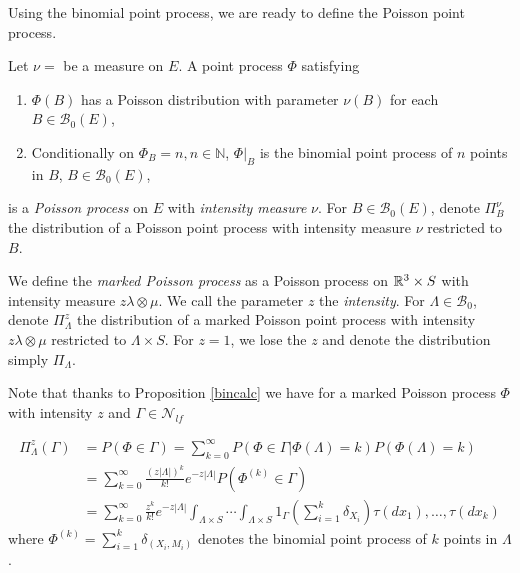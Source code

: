 Using the binomial point process, we are ready to define the Poisson point process. 

\begin{definition} Let $\nu=$ be a measure on $E$. A point process $\Phi$ satisfying
\begin{enumerate}
	\item $\Phi(B)$ has a Poisson distribution with parameter $\nu(B)$ for each $B\in \mathcal B_0(E)$,
	\item Conditionally on $\Phi_B=n, n\in\mathbb N$,  $\Phi|_B$ is the binomial point process of $n$ points in $B$, $B \in \mathcal B_0(E)$,
\end{enumerate}
is a \textit{Poisson process} on $E$ with \textit{intensity measure} $\nu$.
For $B\in \mathcal B_0(E)$, denote $\Pi^\nu_B$ the distribution of a Poisson point process with intensity measure $\nu$ restricted to $B$.  
\end{definition}

\begin{definition}We define the \textit{marked Poisson process} as a Poisson process on ${\mathbb R^3}\times S$ with intensity measure $z\lambda \otimes \mu$. We call the parameter $z$ the \textit{intensity}.\newline
	For $\Lambda\in \mathcal B_0$, denote $\Pi^z_\Lambda$ the distribution of a marked Poisson point process with intensity $z\lambda \otimes \mu$ restricted to $\Lambda\times S$. For $z=1$, we lose the $z$ and denote the distribution simply $\Pi_\Lambda$.
\end{definition}


Note that thanks to Proposition \ref{bincalc} we have for a marked Poisson process $\Phi$ with intensity $z$ and $\Gamma \in \mathcal N_{lf}$ 

\begin{align}\label{eq:poiscalc}
	\Pi^z_\Lambda(\Gamma) &= P(\Phi \in \Gamma) = \sum^\infty_{k=0} P(\Phi \in \Gamma | \Phi(\Lambda) = k) P(\Phi(\Lambda)=k) \\
	& = \sum^\infty_{k=0} \frac{(z|\Lambda|)^k}{k!} e^{-z|\Lambda|} P(\Phi^{(k)}\in \Gamma) \nonumber \\ 
	& = \sum^\infty_{k=0} \frac{z^k}{k!} e^{-z|\Lambda|} \int_{\Lambda\times S} \cdots \int_{\Lambda\times S} 1_{\Gamma} \left(\sum^k_{i=1} \delta_{X_i}\right) \tau(dx_1), \dots, \tau(dx_k) \nonumber
\end{align}
where $\Phi^{(k)} = \sum^k_{i=1}\delta_{(X_i,M_i)}$ denotes the binomial point process of $k$ points in $\Lambda$.

